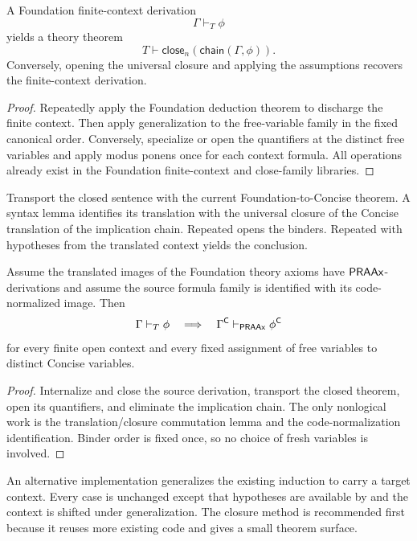 \begin{lemma}
A Foundation finite-context derivation
\[
   \Gamma\vdash_T\phi
\]
yields a theory theorem
\[
   T\vdash\mathsf{close}_n(\mathsf{chain}(\Gamma,\phi)).
\]
Conversely, opening the universal closure and applying the assumptions recovers
the finite-context derivation.
\end{lemma}

\begin{proof}
Repeatedly apply the Foundation deduction theorem to discharge the finite
context.  Then apply generalization to the free-variable family in the fixed
canonical order.  Conversely, specialize or open the quantifiers at the
distinct free variables and apply modus ponens once for each context formula.
All operations already exist in the Foundation finite-context and close-family
libraries.
\end{proof}

Transport the closed sentence with the current Foundation-to-Concise theorem.
A syntax lemma identifies its translation with the universal closure of the
Concise translation of the implication chain.  Repeated 
opens the binders.  Repeated  with hypotheses from the translated
context yields the conclusion.

\begin{theorem}
Assume the translated images of the Foundation theory axioms have
\(\mathsf{PRAAx}\)-derivations and assume the source formula family is identified with
its code-normalized image.  Then
\[
   \Gamma\vdash_T\phi
   \quad\Longrightarrow\quad
   \Gamma^{\mathsf C}\vdash_{\mathsf{PRAAx}}\phi^{\mathsf C}
\]
for every finite open context and every fixed assignment of free variables to
distinct Concise variables.
\end{theorem}

\begin{proof}
Internalize and close the source derivation, transport the closed theorem,
open its quantifiers, and eliminate the implication chain.  The only
nonlogical work is the translation/closure commutation lemma and the
code-normalization identification.  Binder order is fixed once, so no choice
of fresh variables is involved.
\end{proof}

An alternative implementation generalizes the existing
 induction to carry a target context.  Every case is
unchanged except that hypotheses are available by  and the
context is shifted under generalization.  The closure method is recommended
first because it reuses more existing code and gives a small theorem surface.

